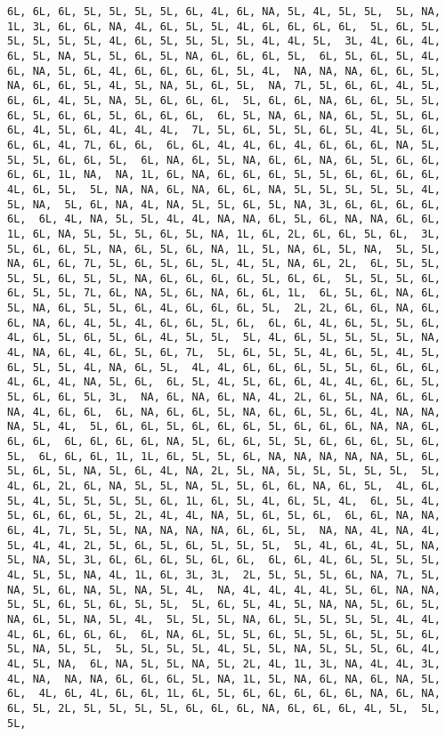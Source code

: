 \documentclass[
]{article}
\begin{document}
\begin{verbatim}
6L, 6L, 6L, 5L, 5L, 5L, 5L, 6L, 4L, 6L, NA, 5L, 4L, 5L, 5L,  5L, NA, 1L, 3L, 6L, 6L, NA, 4L, 6L, 5L, 5L, 4L, 6L, 6L, 6L, 6L,  5L, 6L, 5L, 5L, 5L, 5L, 5L, 4L, 6L, 5L, 5L, 5L, 5L, 4L, 4L, 5L,  3L, 4L, 6L, 4L, 6L, 5L, NA, 5L, 5L, 6L, 5L, NA, 6L, 6L, 6L, 5L,  6L, 5L, 6L, 5L, 4L, 6L, NA, 5L, 6L, 4L, 6L, 6L, 6L, 6L, 5L, 4L,  NA, NA, NA, 6L, 6L, 5L, NA, 6L, 6L, 5L, 4L, 5L, NA, 5L, 6L, 5L,  NA, 7L, 5L, 6L, 6L, 4L, 5L, 6L, 6L, 4L, 5L, NA, 5L, 6L, 6L, 6L,  5L, 6L, 6L, NA, 6L, 6L, 5L, 5L, 6L, 5L, 6L, 6L, 5L, 6L, 6L, 6L,  6L, 5L, NA, 6L, NA, 6L, 5L, 5L, 6L, 6L, 4L, 5L, 6L, 4L, 4L, 4L,  7L, 5L, 6L, 5L, 5L, 6L, 5L, 4L, 5L, 6L, 6L, 6L, 4L, 7L, 6L, 6L,  6L, 6L, 4L, 4L, 6L, 4L, 6L, 6L, 6L, NA, 5L, 5L, 5L, 6L, 6L, 5L,  6L, NA, 6L, 5L, NA, 6L, 6L, NA, 6L, 5L, 6L, 6L, 6L, 6L, 1L, NA,  NA, 1L, 6L, NA, 6L, 6L, 6L, 5L, 5L, 6L, 6L, 6L, 6L, 4L, 6L, 5L,  5L, NA, NA, 6L, NA, 6L, 6L, NA, 5L, 5L, 5L, 5L, 5L, 4L, 5L, NA,  5L, 6L, NA, 4L, NA, 5L, 5L, 6L, 5L, NA, 3L, 6L, 6L, 6L, 6L, 6L,  6L, 4L, NA, 5L, 5L, 4L, 4L, NA, NA, 6L, 5L, 6L, NA, NA, 6L, 6L,  1L, 6L, NA, 5L, 5L, 5L, 6L, 5L, NA, 1L, 6L, 2L, 6L, 6L, 5L, 6L,  3L, 5L, 6L, 6L, 5L, NA, 6L, 5L, 6L, NA, 1L, 5L, NA, 6L, 5L, NA,  5L, 5L, NA, 6L, 6L, 7L, 5L, 6L, 5L, 6L, 5L, 4L, 5L, NA, 6L, 2L,  6L, 5L, 5L, 5L, 5L, 6L, 5L, 5L, NA, 6L, 6L, 6L, 6L, 5L, 6L, 6L,  5L, 5L, 5L, 6L, 6L, 5L, 5L, 7L, 6L, NA, 5L, 6L, NA, 6L, 6L, 1L,  6L, 5L, 6L, NA, 6L, 5L, NA, 6L, 5L, 5L, 6L, 4L, 6L, 6L, 6L, 5L,  2L, 2L, 6L, 6L, NA, 6L, 6L, NA, 6L, 4L, 5L, 4L, 6L, 6L, 5L, 6L,  6L, 6L, 4L, 6L, 5L, 5L, 6L, 4L, 6L, 5L, 6L, 5L, 6L, 4L, 5L, 5L,  5L, 4L, 6L, 5L, 5L, 5L, 5L, NA, 4L, NA, 6L, 4L, 6L, 5L, 6L, 7L,  5L, 6L, 5L, 5L, 4L, 6L, 5L, 4L, 5L, 6L, 5L, 5L, 4L, NA, 6L, 5L,  4L, 4L, 6L, 6L, 6L, 5L, 5L, 6L, 6L, 6L, 4L, 6L, 4L, NA, 5L, 6L,  6L, 5L, 4L, 5L, 6L, 6L, 4L, 4L, 6L, 6L, 5L, 5L, 6L, 6L, 5L, 3L,  NA, 6L, NA, 6L, NA, 4L, 2L, 6L, 5L, NA, 6L, 6L, NA, 4L, 6L, 6L,  6L, NA, 6L, 6L, 5L, NA, 6L, 6L, 5L, 6L, 4L, NA, NA, NA, 5L, 4L,  5L, 6L, 6L, 5L, 6L, 6L, 6L, 5L, 6L, 6L, 6L, NA, NA, 6L, 6L, 6L,  6L, 6L, 6L, 6L, NA, 5L, 6L, 6L, 5L, 5L, 6L, 6L, 6L, 5L, 6L, 5L,  6L, 6L, 6L, 1L, 1L, 6L, 5L, 5L, 6L, NA, NA, NA, NA, NA, 5L, 6L,  5L, 6L, 5L, NA, 5L, 6L, 4L, NA, 2L, 5L, NA, 5L, 5L, 5L, 5L, 5L,  5L, 4L, 6L, 2L, 6L, NA, 5L, 5L, NA, 5L, 5L, 6L, 6L, NA, 6L, 5L,  4L, 6L, 5L, 4L, 5L, 5L, 5L, 5L, 6L, 1L, 6L, 5L, 4L, 6L, 5L, 4L,  6L, 5L, 4L, 5L, 6L, 6L, 6L, 5L, 2L, 4L, 4L, NA, 5L, 6L, 5L, 6L,  6L, 6L, NA, NA, 6L, 4L, 7L, 5L, 5L, NA, NA, NA, NA, 6L, 6L, 5L,  NA, NA, 4L, NA, 4L, 5L, 4L, 4L, 2L, 5L, 6L, 5L, 6L, 5L, 5L, 5L,  5L, 4L, 6L, 4L, 5L, NA, 5L, NA, 5L, 3L, 6L, 6L, 6L, 5L, 6L, 6L,  6L, 6L, 4L, 6L, 5L, 5L, 5L, 4L, 5L, 5L, NA, 4L, 1L, 6L, 3L, 3L,  2L, 5L, 5L, 5L, 6L, NA, 7L, 5L, NA, 5L, 6L, NA, 5L, NA, 5L, 4L,  NA, 4L, 4L, 4L, 4L, 5L, 6L, NA, NA, 5L, 5L, 6L, 5L, 6L, 5L, 5L,  5L, 6L, 5L, 4L, 5L, NA, NA, 5L, 6L, 5L, NA, 6L, 5L, NA, 5L, 4L,  5L, 5L, 5L, NA, 6L, 5L, 5L, 5L, 5L, 4L, 4L, 4L, 6L, 6L, 6L, 6L,  6L, NA, 6L, 5L, 5L, 6L, 5L, 5L, 6L, 5L, 5L, 6L, 5L, NA, 5L, 5L,  5L, 5L, 5L, 5L, 4L, 5L, 5L, NA, 5L, 5L, 5L, 6L, 4L, 4L, 5L, NA,  6L, NA, 5L, 5L, NA, 5L, 2L, 4L, 1L, 3L, NA, 4L, 4L, 3L, 4L, NA,  NA, NA, 6L, 6L, 6L, 5L, NA, 1L, 5L, NA, 6L, NA, 6L, NA, 5L, 6L,  4L, 6L, 4L, 6L, 6L, 1L, 6L, 5L, 6L, 6L, 6L, 6L, 6L, NA, 6L, NA,  6L, 5L, 2L, 5L, 5L, 5L, 5L, 6L, 6L, 6L, NA, 6L, 6L, 6L, 4L, 5L,  5L, 5L, 
\end{verbatim}
\end{document}
